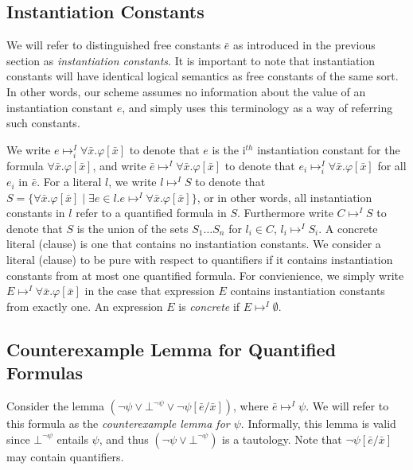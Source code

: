 \documentclass{llncs}
\begin{document}
\subsection{Instantiation Constants}

We will refer to distinguished free constants $\bar{e}$ as introduced in the previous section as \emph{instantiation constants}.
It is important to note that instantiation constants will have identical logical semantics as free constants of the same sort.
In other words, our scheme assumes no information about the value of an instantiation constant $e$, and simply uses this terminology as a way of referring such constants.

We write $e \mapsto^I_i \forall \bar{x}. \varphi[ \bar{x} ]$ to denote that $e$ is the i$^{th}$ instantiation constant for the formula $\forall \bar{x}. \varphi[ \bar{x} ] $, and write $\bar{e} \mapsto^I \forall \bar{x}. \varphi[ \bar{x} ]$ to denote that $e_i \mapsto^I_i \forall \bar{x}. \varphi[ \bar{x} ]$ for all $e_i$ in $\bar{e}$.
For a literal $l$, we write $l \mapsto^I S$ to denote that $S = \{ \forall \bar{x}. \varphi[ \bar{x} ] \mid \exists e \in l. e \mapsto^I \forall \bar{x}. \varphi[ \bar{x} ] \}$, or in other words, all instantiation constants in $l$ refer to a quantified formula in $S$.
Furthermore write $C \mapsto^I S$ to denote that $S$ is the union of the sets $S_1 \ldots S_n$ for $l_i \in C$, $l_i \mapsto^I S_i$.
A concrete literal (clause) is one that contains no instantiation constants.
We consider a literal (clause) to be pure with respect to quantifiers if it contains instantiation constants from at most one quantified formula.
For convienience, we simply write $E \mapsto^I \forall \bar{x}. \varphi[ \bar{x} ]$ in the case that expression $E$ contains instantiation constants from exactly one.
An expression $E$ is \emph{concrete} if $E \mapsto^I \emptyset$.

\subsection{Counterexample Lemma for Quantified Formulas}

Consider the lemma $( \neg \psi \vee \bot^{\neg \psi} \vee \neg \psi[\bar{e}/\bar{x}])$, where $\bar{e} \mapsto^I \psi$.
We will refer to this formula as the \emph{counterexample lemma for $\psi$}.
Informally, this lemma is valid since $\bot^{\neg \psi}$ entails $\psi$, and thus $( \neg \psi \vee \bot^{\neg \psi} )$ is a tautology.
Note that $\neg \psi[\bar{e}/\bar{x}]$ may contain quantifiers.
\end{document}
